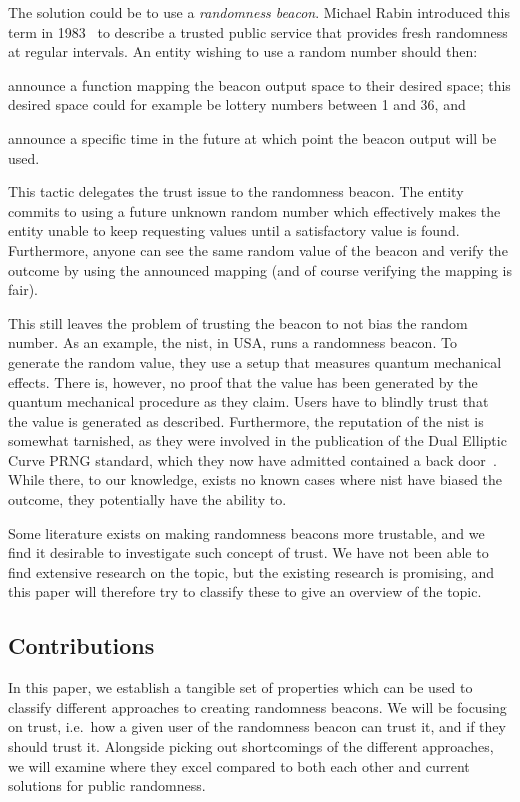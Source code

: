The solution could be to use a \emph{randomness beacon}.
Michael Rabin introduced this term in 1983~\cite{rabin1983transaction} to describe a trusted public service that provides fresh randomness at regular intervals.
An entity wishing to use a random number should then:
\begin{eromanate*}
    \item announce a function mapping the beacon output space to their desired space; this desired space could for example be lottery numbers between 1 and 36, and
    \item announce a specific time in the future at which point the beacon output will be used.
\end{eromanate*}
This tactic delegates the trust issue to the randomness beacon.
The entity commits to using a future unknown random number which effectively makes the entity unable to keep requesting values until a satisfactory value is found.
Furthermore, anyone can see the same random value of the beacon and verify the outcome by using the announced mapping (and of course verifying the mapping is fair).

This still leaves the problem of trusting the beacon to not bias the random number.
As an example, the \gls{nist}, in USA, runs a randomness beacon.
To generate the random value, they use a setup that measures quantum mechanical effects.
There is, however, no proof that the value has been generated by the quantum mechanical procedure as they claim.
Users have to blindly trust that the value is generated as described.
Furthermore, the reputation of the \gls{nist} is somewhat tarnished, as they were involved in the publication of the Dual Elliptic Curve PRNG standard, which they now have admitted contained a back door~\cite{nist2014backdoor}.
While there, to our knowledge, exists no known cases where \gls{nist} have biased the outcome, they potentially have the ability to.

Some literature exists on making randomness beacons more trustable, and we find it desirable to investigate such concept of trust.
We have not been able to find extensive research on the topic, but the existing research is promising, and this paper will therefore try to classify these to give an overview of the topic.

\subsection*{Contributions}\label{subsec:contributions}
In this paper, we establish a tangible set of properties which can be used to classify different approaches to creating randomness beacons.
We will be focusing on trust, i.e.\ how a given user of the randomness beacon can trust it, and if they should trust it.
Alongside picking out shortcomings of the different approaches, we will examine where they excel compared to both each other and current solutions for public randomness.

